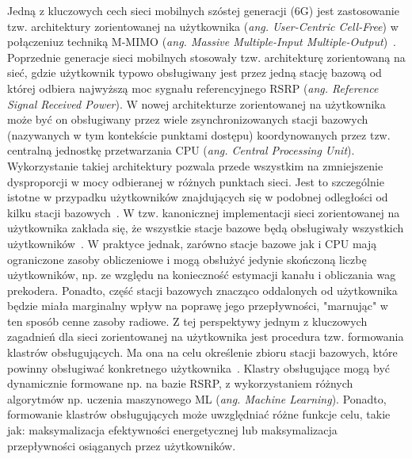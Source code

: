 \documentclass[a4paper]{article}
\begin{document}
\begin{multicols}{2}
Jedną z kluczowych cech sieci mobilnych szóstej generacji (6G) jest zastosowanie tzw. architektury zorientowanej na użytkownika (\textit{ang. User-Centric Cell-Free}) w połączeniu\newline z techniką M-MIMO (\textit{ang. Massive Multiple-Input Multiple-Output})~\cite{yang2021}. Poprzednie generacje sieci mobilnych stosowały tzw. architekturę zorientowaną na sieć, gdzie użytkownik typowo obsługiwany jest przez jedną stację bazową od której odbiera najwyższą moc sygnału referencyjnego RSRP (\textit{ang. Reference Signal Received Power}). W nowej architekturze zorientowanej na użytkownika może być on obsługiwany przez wiele zsynchronizowanych stacji bazowych (nazywanych w tym kontekście punktami dostępu) koordynowanych przez tzw. centralną jednostkę przetwarzania CPU (\textit{ang. Central Processing Unit}). Wykorzystanie takiej architektury pozwala przede wszystkim na zmniejszenie dysproporcji w mocy odbieranej w różnych punktach sieci. Jest to szczególnie istotne w przypadku użytkowników znajdujących się w podobnej odległości od kilku stacji bazowych~\cite{ngo2015}. W tzw. kanonicznej implementacji sieci zorientowanej na użytkownika zakłada się, że wszystkie stacje bazowe będą obsługiwały wszystkich użytkowników~\cite{buzzi2017}. W praktyce jednak, zarówno stacje bazowe jak i CPU mają ograniczone zasoby obliczeniowe i mogą obsłużyć jedynie skończoną liczbę użytkowników, np. ze względu na konieczność estymacji kanału i obliczania wag prekodera. Ponadto, część stacji bazowych znacząco oddalonych od użytkownika będzie miała marginalny wpływ na poprawę jego przepływności, "marnując" w ten sposób cenne zasoby radiowe. Z tej perspektywy jednym z kluczowych zagadnień dla sieci zorientowanej na użytkownika jest procedura tzw. formowania klastrów obsługujących. Ma ona na celu określenie zbioru stacji bazowych, które powinny obsługiwać konkretnego użytkownika~\cite{ammar2022}. Klastry obsługujące mogą być dynamicznie formowane np. na bazie RSRP, z wykorzystaniem różnych algorytmów np. uczenia maszynowego ML (\textit{ang. Machine Learning}). Ponadto, formowanie klastrów obsługujących może uwzględniać różne funkcje celu, takie jak: maksymalizacja efektywności energetycznej lub maksymalizacja przepływności osiąganych przez użytkowników.


\end{multicols}
\end{document}
